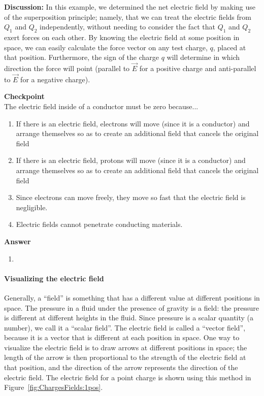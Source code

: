 \begin{framed}
\begin{framed}
\textbf{Discussion:} In this example, we determined the net electric field by making use of the superposition principle; namely, that we can treat the electric fields from $Q_1$ and $Q_2$ independently, without needing to consider the fact that $Q_1$ and $Q_2$ exert forces on each other. By knowing the electric field at some position in space, we can easily calculate the force vector on any test charge, $q$, placed at that position. Furthermore, the sign of the charge $q$ will determine in which direction the force will point (parallel to $\vec E$ for a positive charge and anti-parallel to $\vec E$ for a negative charge).
\end{framed}
\end{framed}

\begin{framed}
\textbf{Checkpoint}\\
The electric field inside of a conductor must be zero because...

\begin{enumerate}
\item If there is an electric field, electrons will move (since it is a conductor) and arrange themselves so as to create an additional field that cancels the original field
\item If there is an electric field, protons will move (since it is a conductor) and arrange themselves so as to create an additional field that cancels the original field
\item Since electrons can move freely, they move so fast that the electric field is negligible.
\item Electric fields cannot penetrate conducting materials.
\end{enumerate}

\begin{framed}
\textbf{Answer}\\
\begin{enumerate}
\item
\end{enumerate}
\end{framed}
\end{framed}

\paragraph{Visualizing the electric field}

Generally, a ``field'' is something that has a different value at different positions in space. The pressure in a fluid under the presence of gravity is a field: the pressure is different at different heights in the fluid. Since pressure is a scalar quantity (a number), we call it a ``scalar field''. The electric field is called a ``vector field'', because it is a vector that is different at each position in space. One way to visualize the electric field is to draw arrows at different positions in space; the length of the arrow is then proportional to the strength of the electric field at that position, and the direction of the arrow represents the direction of the electric field. The electric field for a point charge is shown using this method in Figure~\ref{fig:ChargesFields:1pos}.

